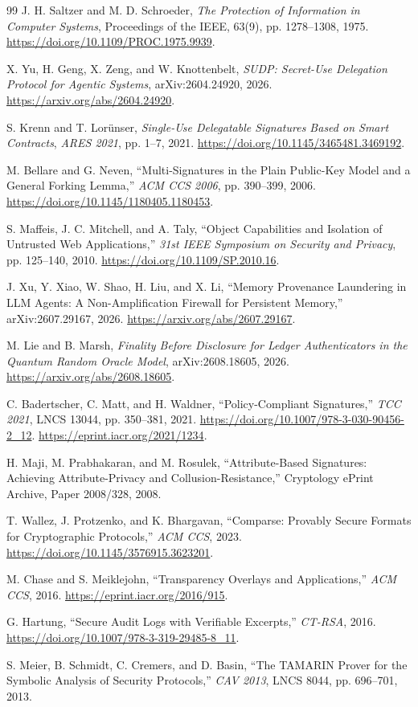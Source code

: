 \documentclass[10pt]{article}
\begin{document}
\begin{thebibliography}{99}
J. H. Saltzer and M. D. Schroeder,
\emph{The Protection of Information in Computer Systems},
Proceedings of the IEEE, 63(9), pp. 1278--1308, 1975.
\url{https://doi.org/10.1109/PROC.1975.9939}.

X. Yu, H. Geng, X. Zeng, and W. Knottenbelt,
\emph{SUDP: Secret-Use Delegation Protocol for Agentic Systems},
arXiv:2604.24920, 2026.
\url{https://arxiv.org/abs/2604.24920}.

S. Krenn and T. Lor\"unser,
\emph{Single-Use Delegatable Signatures Based on Smart Contracts},
\emph{ARES 2021}, pp. 1--7, 2021.
\url{https://doi.org/10.1145/3465481.3469192}.

M. Bellare and G. Neven,
``Multi-Signatures in the Plain Public-Key Model and a General Forking Lemma,''
\emph{ACM CCS 2006}, pp. 390--399, 2006.
\url{https://doi.org/10.1145/1180405.1180453}.

S. Maffeis, J. C. Mitchell, and A. Taly,
``Object Capabilities and Isolation of Untrusted Web Applications,''
\emph{31st IEEE Symposium on Security and Privacy}, pp. 125--140, 2010.
\url{https://doi.org/10.1109/SP.2010.16}.

J. Xu, Y. Xiao, W. Shao, H. Liu, and X. Li,
``Memory Provenance Laundering in LLM Agents: A Non-Amplification Firewall for
Persistent Memory,'' arXiv:2607.29167, 2026.
\url{https://arxiv.org/abs/2607.29167}.

M. Lie and B. Marsh,
\emph{Finality Before Disclosure for Ledger Authenticators in the Quantum
Random Oracle Model}, arXiv:2608.18605, 2026.
\url{https://arxiv.org/abs/2608.18605}.

C. Badertscher, C. Matt, and H. Waldner,
``Policy-Compliant Signatures,''
\emph{TCC 2021}, LNCS 13044, pp. 350--381, 2021.
\url{https://doi.org/10.1007/978-3-030-90456-2_12}.
\url{https://eprint.iacr.org/2021/1234}.

H. Maji, M. Prabhakaran, and M. Rosulek,
``Attribute-Based Signatures: Achieving Attribute-Privacy and
Collusion-Resistance,'' Cryptology ePrint Archive, Paper 2008/328, 2008.

T. Wallez, J. Protzenko, and K. Bhargavan,
``Comparse: Provably Secure Formats for Cryptographic Protocols,''
\emph{ACM CCS}, 2023.
\url{https://doi.org/10.1145/3576915.3623201}.

M. Chase and S. Meiklejohn,
``Transparency Overlays and Applications,''
\emph{ACM CCS}, 2016.
\url{https://eprint.iacr.org/2016/915}.

G. Hartung,
``Secure Audit Logs with Verifiable Excerpts,''
\emph{CT-RSA}, 2016.
\url{https://doi.org/10.1007/978-3-319-29485-8_11}.

S. Meier, B. Schmidt, C. Cremers, and D. Basin,
``The TAMARIN Prover for the Symbolic Analysis of Security Protocols,''
\emph{CAV 2013}, LNCS 8044, pp. 696--701, 2013.

\end{thebibliography}
\end{document}
